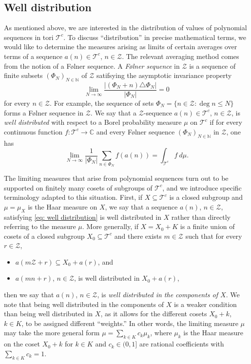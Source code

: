 \documentclass[11pt]{amsart}
\theoremstyle{theorem}
\theoremstyle{definition}
\newcommand{\N}{\mathbb{N}}
\newcommand{\C}{\mathbb{C}}
\newcommand{\mZ}{\mathcal{Z}}
\newcommand{\mT}{\mathcal{T}}
\begin{document}

\subsection{Well distribution}

As mentioned above, we are interested in the distribution of values of polynomial sequences in tori $\mT^c$.
To discuss ``distribution'' in precise mathematical terms, we would like to determine the measures arising as limits of certain averages over terms of a sequence $a(n) \in \mT^c$, $n \in \mZ$.
The relevant averaging method comes from the notion of a F{\o}lner sequence.
A \emph{F{\o}lner sequence} in $\mZ$ is a sequence of finite subsets $(\Phi_N)_{N \in \N}$ of $\mZ$ satifsying the asymptotic invariance property
\begin{equation*}
	\lim_{N \to \infty} \frac{\left| (\Phi_N+n) \triangle \Phi_N \right|}{|\Phi_N|} = 0
\end{equation*}
for every $n \in \mZ$.
For example, the sequence of sets $\Phi_N = \{n \in \mZ : \deg{n} \le N\}$ forms a F{\o}lner sequence in $\mZ$.
We say that a $\mZ$-sequence $a(n) \in \mT^c$, $n \in \mZ$, is \emph{well distributed} with respect to a Borel probability measure $\mu$ on $\mT^c$ if for every continuous function $f : \mT^c \to \C$ and every F{\o}lner sequence $(\Phi_N)_{N \in \N}$ in $\mZ$, one has
\begin{equation} \label{eq: well distribution}
	\lim_{N \to \infty} \frac{1}{|\Phi_N|} \sum_{n \in \Phi_N} f(a(n)) = \int_{\mT^c} f~d\mu.
\end{equation}

The limiting measures that arise from polynomial sequences turn out to be supported on finitely many cosets of subgroups of $\mT^c$, and we introduce specific terminology adapted to this situation.
First, if $X \subseteq \mT^c$ is a closed subgroup and $\mu = \mu_X$ is the Haar measure on $X$, we say that a sequence $a(n)$, $n \in \mZ$, satisfying \eqref{eq: well distribution} is well distributed in $X$ rather than directly referring to the measure $\mu$.
More generally, if $X = X_0 + K$ is a finite union of cosets of a closed subgroup $X_0 \subseteq \mT^c$ and there exists $m \in \mZ$ such that for every $r \in \mZ$,
\begin{itemize}
	\item	$a(m\mZ+r) \subseteq X_0 + a(r)$, and
	\item	$a(mn+r)$, $n \in \mZ$, is well distributed in $X_0 + a(r)$,
\end{itemize}
then we say that $a(n)$, $n \in \mZ$, is \emph{well distributed in the components of $X$}.
We note that being well distributed in the components of $X$ is a weaker condition than being well distributed in $X$, as it allows for the different cosets $X_0 + k$, $k \in K$, to be assigned different ``weights.''
In other words, the limiting measure $\mu$ may take the more general form $\mu = \sum_{k \in K} c_k \mu_k$, where $\mu_k$ is the Haar measure on the coset $X_0 + k$ for $k \in K$ and $c_k \in (0,1]$ are rational coefficients with $\sum_{k \in K} c_k = 1$.
\end{document}
